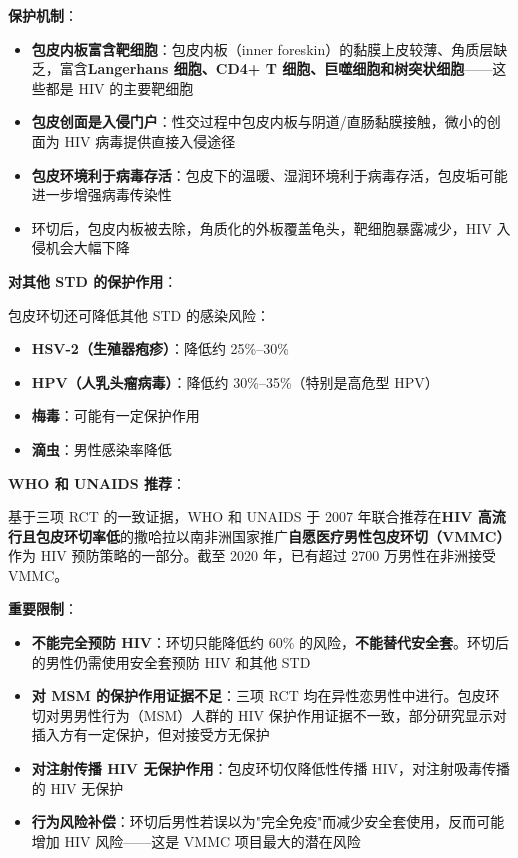 \vspace{0.5em}
\noindent\textbf{保护机制}：

\begin{itemize}[leftmargin=2cm]
	\item \textbf{包皮内板富含靶细胞}：包皮内板（inner foreskin）的黏膜上皮较薄、角质层缺乏，富含\textbf{Langerhans 细胞、CD4+ T 细胞、巨噬细胞和树突状细胞}——这些都是 HIV 的主要靶细胞
	\item \textbf{包皮创面是入侵门户}：性交过程中包皮内板与阴道/直肠黏膜接触，微小的创面为 HIV 病毒提供直接入侵途径
	\item \textbf{包皮环境利于病毒存活}：包皮下的温暖、湿润环境利于病毒存活，包皮垢可能进一步增强病毒传染性
	\item 环切后，包皮内板被去除，角质化的外板覆盖龟头，靶细胞暴露减少，HIV 入侵机会大幅下降
\end{itemize}

\vspace{0.5em}
\noindent\textbf{对其他 STD 的保护作用}：

包皮环切还可降低其他 STD 的感染风险：
\begin{itemize}[leftmargin=2cm]
	\item \textbf{HSV-2（生殖器疱疹）}：降低约 25\%--30\%
	\item \textbf{HPV（人乳头瘤病毒）}：降低约 30\%--35\%（特别是高危型 HPV）
	\item \textbf{梅毒}：可能有一定保护作用
	\item \textbf{滴虫}：男性感染率降低
\end{itemize}

\vspace{0.5em}
\noindent\textbf{WHO 和 UNAIDS 推荐}：

基于三项 RCT 的一致证据，WHO 和 UNAIDS 于 2007 年联合推荐在\textbf{HIV 高流行且包皮环切率低}的撒哈拉以南非洲国家推广\textbf{自愿医疗男性包皮环切（VMMC）}作为 HIV 预防策略的一部分。截至 2020 年，已有超过 2700 万男性在非洲接受 VMMC。

\vspace{0.5em}
\noindent\textbf{重要限制}：

\begin{itemize}[leftmargin=2cm]
	\item \textbf{不能完全预防 HIV}：环切只能降低约 60\% 的风险，\textbf{不能替代安全套}。环切后的男性仍需使用安全套预防 HIV 和其他 STD
	\item \textbf{对 MSM 的保护作用证据不足}：三项 RCT 均在异性恋男性中进行。包皮环切对男男性行为（MSM）人群的 HIV 保护作用证据不一致，部分研究显示对插入方有一定保护，但对接受方无保护
	\item \textbf{对注射传播 HIV 无保护作用}：包皮环切仅降低性传播 HIV，对注射吸毒传播的 HIV 无保护
	\item \textbf{行为风险补偿}：环切后男性若误以为"完全免疫"而减少安全套使用，反而可能增加 HIV 风险——这是 VMMC 项目最大的潜在风险
\end{itemize}

